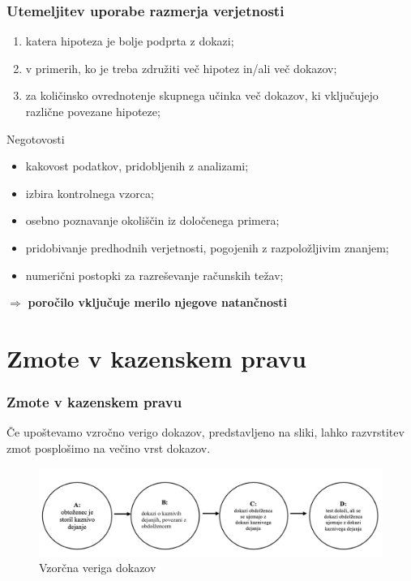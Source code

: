 \documentclass{beamer}
\begin{document}
\begin{frame}
    \frametitle{Utemeljitev uporabe razmerja verjetnosti}
    \begin{enumerate}
        \item katera hipoteza je bolje podprta z dokazi;
        \item v primerih, ko je treba združiti več hipotez in/ali več dokazov;
        \item za količinsko ovrednotenje skupnega učinka več dokazov, ki vključujejo različne povezane hipoteze;
    \end{enumerate} \vspace{3mm}
    \begin{block}{Negotovosti}
        \begin{itemize}
            \item kakovost podatkov, pridobljenih z analizami;
            \item izbira kontrolnega vzorca;
            \item osebno poznavanje okoliščin iz določenega primera;
            \item pridobivanje predhodnih verjetnosti, pogojenih z razpoložljivim znanjem;
            \item numerični postopki za razreševanje računskih težav;
        \end{itemize}
    \end{block} \vspace{2mm}
    \centering
    $\Rightarrow$ \textbf{poročilo vključuje merilo njegove natančnosti}
\end{frame}

\section{Zmote v kazenskem pravu}

\begin{frame}
    \frametitle{Zmote v kazenskem pravu}
    Če upoštevamo vzročno verigo dokazov, predstavljeno na sliki, lahko razvrstitev zmot posplošimo na večino vrst dokazov. 
    \begin{figure}[!ht]\label{fig:slika_3}
        \centering
        \includegraphics[scale=0.50]{slika_3.png}
        \caption{Vzorčna veriga dokazov}
    \end{figure}
\end{frame}
\end{document}
